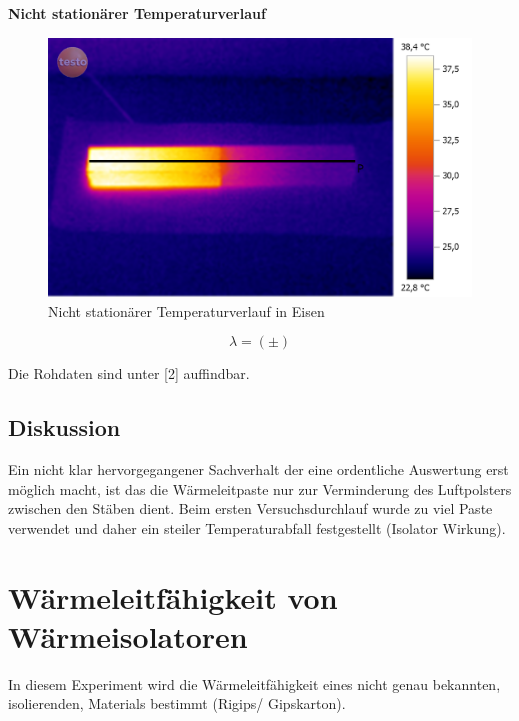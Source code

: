 \documentclass[12pt,a4paper]{article}
\begin{document}
\begin{multicols}{2}

\textbf{Nicht stationärer Temperaturverlauf}
\begin{figure}[H]
	\centering
	\includegraphics[scale=0.12]{./BilderCorrect/Versuch_1_gradient_60.png}
	\caption{Nicht stationärer Temperaturverlauf in Eisen}
	\label{fig:nicht_stat_verlauf}
\end{figure}

$$\lambda = ( \pm )$$

Die Rohdaten sind unter [2] auffindbar.

\subsection{Diskussion}
Ein nicht klar hervorgegangener Sachverhalt der eine ordentliche Auswertung erst möglich macht, ist das die Wärmeleitpaste nur zur Verminderung des Luftpolsters zwischen den Stäben dient. Beim ersten Versuchsdurchlauf wurde zu viel Paste verwendet und daher ein steiler Temperaturabfall festgestellt (Isolator Wirkung).\\



\section{Wärmeleitfähigkeit von Wärmeisolatoren}
In diesem Experiment wird die Wärmeleitfähigkeit eines nicht genau bekannten, isolierenden, Materials bestimmt (Rigips/ Gipskarton).


\end{multicols}
\end{document}
